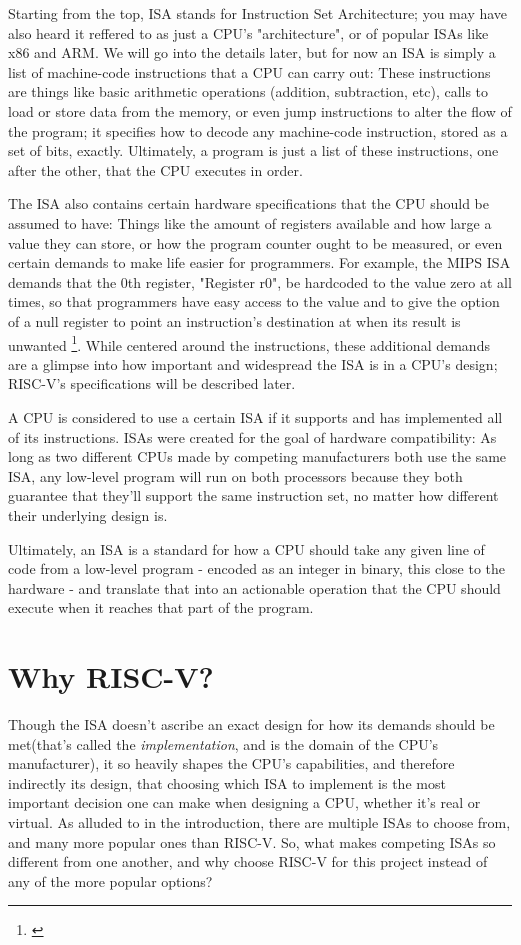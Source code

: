 \documentclass[12pt,twoside]{reedthesis}
\begin{document}
Starting from the top, ISA stands for Instruction Set Architecture; you may have also heard it reffered to as just a CPU's "architecture", or of popular ISAs like x86 and ARM. We will go into the details later, but for now an ISA is simply a list of machine-code instructions that a CPU can carry out: These instructions are things like basic arithmetic operations (addition, subtraction, etc), calls to load or store data from the memory, or even jump instructions to alter the flow of the program; it specifies how to decode any machine-code instruction, stored as a set of bits, exactly. Ultimately, a program is just a list of these instructions, one after the other, that the CPU executes in order.

The ISA also contains certain hardware specifications that the CPU should be assumed to have: Things like the amount of registers available and how large a value they can store, or how the program counter ought to be measured, or even certain demands to make life easier for programmers. For example, the MIPS ISA demands that the 0th register, "Register r0", be hardcoded to the value zero at all times, so that programmers have easy access to the value and to give the option of a null register to point an instruction's destination at when its result is unwanted \footnote{\cite{waterman}}. While centered around the instructions, these additional demands are a glimpse into how important and widespread the ISA is in a CPU's design; RISC-V's specifications will be described later.

A CPU is considered to use a certain ISA if it supports and has implemented all of its instructions. ISAs were created for the goal of hardware compatibility: As long as two different CPUs made by competing manufacturers both use the same ISA, any low-level program will run on both processors because they both guarantee that they'll support the same instruction set, no matter how different their underlying design is.

Ultimately, an ISA is a standard for how a CPU should take any given line of code from a low-level program - encoded as an integer in binary, this close to the hardware - and translate that into an actionable operation that the CPU should execute when it reaches that part of the program.

\section{Why RISC-V?}
Though the ISA doesn't ascribe an exact design for how its demands should be met(that's called the \textit{implementation}, and is the domain of the CPU's manufacturer), it so heavily shapes the CPU's capabilities, and therefore indirectly its design, that choosing which ISA to implement is the most important decision one can make when designing a CPU, whether it's real or virtual. As alluded to in the introduction, there are multiple ISAs to choose from, and many more popular ones than RISC-V. So, what makes competing ISAs so different from one another, and why choose RISC-V for this project instead of any of the more popular options?
\end{document}
